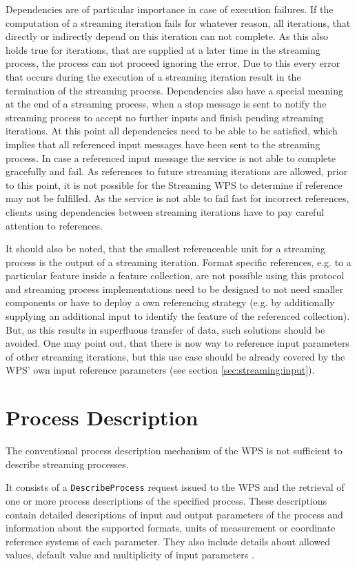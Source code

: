 		Dependencies are of particular importance in case of execution failures. If the computation of a streaming iteration fails for whatever reason, all iterations, that directly or indirectly depend on this iteration can not complete. As this also holds true for iterations, that are supplied at a later time in the streaming process, the process can not proceed ignoring the error. Due to this every error that occurs during the execution of a streaming iteration result in the termination of the streaming process.
		Dependencies also have a special meaning at the end of a streaming process, when a stop message is sent to notify the streaming process to accept no further inputs and finish pending streaming iterations. At this point all dependencies need to be able to be satisfied, which implies that all referenced input messages have been sent to the streaming process. In case a referenced input message the service is not able to complete gracefully and fail. As references to future streaming iterations are allowed, prior to this point, it is not possible for the Streaming \ac{WPS} to determine if reference may not be fulfilled. As the service is not able to fail fast for incorrect references, clients using dependencies between streaming iterations have to pay careful attention to references.

		It should also be noted, that the smallest referenceable unit for a streaming process is the output of a streaming iteration. Format specific references, e.g. to a particular feature inside a feature collection, are not possible using this protocol and streaming process implementations need to be designed to not need smaller components or have to deploy a own referencing strategy (e.g. by additionally supplying an additional input to identify the feature of the referenced collection). But, as this results in superfluous transfer of data, such solutions should be avoided. One may point out, that there is now way to reference input parameters of other streaming iterations, but this use case should be already covered by the \ac{WPS}' own input reference parameters (see section \ref{sec:streaming:input}).

	\section{Process Description}
		\label{sec:stream:processdescription}
		The conventional process description mechanism of the \ac{WPS} is not sufficient to describe streaming processes.

		It consists of a \texttt{DescribeProcess} request issued to the \ac{WPS} and the retrieval of one or more process descriptions of the specified process. These descriptions contain detailed descriptions of input and output parameters of the process and information about the supported formats, units of measurement or coordinate reference systems of each parameter. They also include details about allowed values, default value and multiplicity of input parameters \citep{ogc:wps}.

